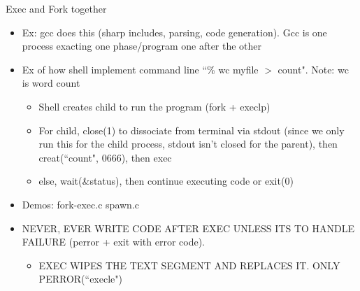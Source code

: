 Exec and Fork together
\begin{itemize}
    \item Ex: gcc does this (sharp includes, parsing, code generation). Gcc is one process exacting one phase/program one after the other
    \item Ex of how shell implement command line ``\% wc myfile $>$ count". Note: wc is word count
    \begin{itemize}
        \item Shell creates child to run the program (fork + execlp)
        \item For child, close(1) to dissociate from terminal via stdout (since we only run this for the child process, stdout isn't closed for the parent), then creat(``count", 0666), then exec
        \item else, wait(\&status), then continue executing code or exit(0)
    \end{itemize}
    \item Demos: fork-exec.c spawn.c
    \item NEVER, EVER WRITE CODE AFTER EXEC UNLESS ITS TO HANDLE FAILURE (perror + exit with error code).
    \begin{itemize}
        \item EXEC WIPES THE TEXT SEGMENT AND REPLACES IT. ONLY PERROR(``execle")
    \end{itemize}
\end{itemize}

